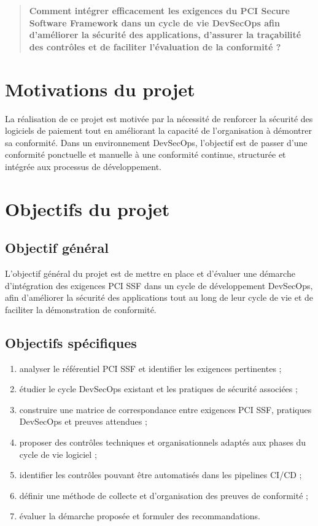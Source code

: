 \begin{quote}
    \textbf{Comment intégrer efficacement les exigences du PCI Secure Software Framework dans un cycle de vie DevSecOps afin d'améliorer la sécurité des applications, d'assurer la traçabilité des contrôles et de faciliter l'évaluation de la conformité ?}
\end{quote}

\section{Motivations du projet}

La réalisation de ce projet est motivée par la nécessité de renforcer la sécurité des logiciels de paiement tout en améliorant la capacité de l'organisation à démontrer sa conformité. Dans un environnement DevSecOps, l'objectif est de passer d'une conformité ponctuelle et manuelle à une conformité continue, structurée et intégrée aux processus de développement.

\section{Objectifs du projet}

\subsection{Objectif général}

L'objectif général du projet est de mettre en place et d'évaluer une démarche d'intégration des exigences PCI SSF dans un cycle de développement DevSecOps, afin d'améliorer la sécurité des applications tout au long de leur cycle de vie et de faciliter la démonstration de conformité.

\subsection{Objectifs spécifiques}

\begin{enumerate}
    \item analyser le référentiel PCI SSF et identifier les exigences pertinentes ;
    \item étudier le cycle DevSecOps existant et les pratiques de sécurité associées ;
    \item construire une matrice de correspondance entre exigences PCI SSF, pratiques DevSecOps et preuves attendues ;
    \item proposer des contrôles techniques et organisationnels adaptés aux phases du cycle de vie logiciel ;
    \item identifier les contrôles pouvant être automatisés dans les pipelines CI/CD ;
    \item définir une méthode de collecte et d'organisation des preuves de conformité ;
    \item évaluer la démarche proposée et formuler des recommandations.
\end{enumerate}

